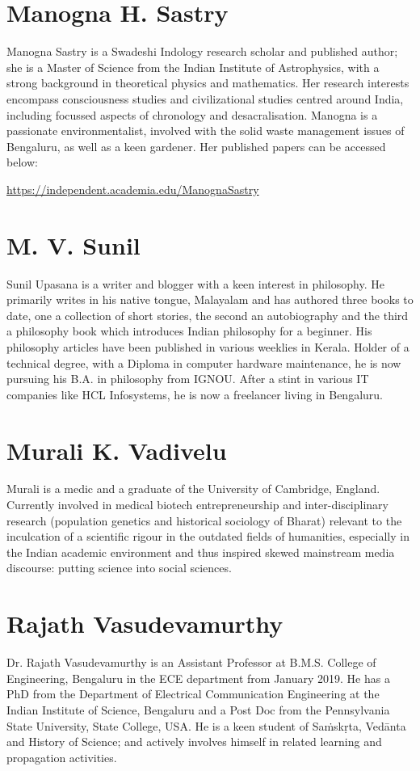 \section*{Manogna H. Sastry}

Manogna Sastry is a Swadeshi Indology research scholar and published author; she is a Master of Science from the Indian Institute of Astrophysics, with a strong background in theoretical physics and mathematics. Her research interests encompass consciousness studies and civilizational studies centred around India, including focussed aspects of chronology and desacralisation. Manogna is a passionate environmentalist, involved with the solid waste management issues of Bengaluru, as well as a keen gardener. Her published papers can be accessed below:

\url{https://independent.academia.edu/ManognaSastry}


\section*{M. V. Sunil}

Sunil Upasana is a writer and blogger with a keen interest in philosophy. He primarily writes in his native tongue, Malayalam and has authored three books to date, one a collection of short stories, the second an autobiography and the third a philosophy book which introduces Indian philosophy for a beginner. His philosophy articles have been published in various weeklies in Kerala. Holder of a technical degree, with a Diploma in computer hardware maintenance, he is now pursuing his B.A. in philosophy from IGNOU. After a stint in various IT companies like HCL Infosystems, he is now a freelancer living in Bengaluru.


\section*{Murali K. Vadivelu}

Murali is a medic and a graduate of the University of Cambridge, England. Currently involved in medical biotech entrepreneurship and inter-disciplinary research (population genetics and historical sociology of Bharat) relevant to the inculcation of a scientific rigour in the outdated fields of humanities, especially in the Indian academic environment and thus inspired skewed mainstream media discourse: putting science into social sciences.


\section*{Rajath Vasudevamurthy}

Dr. Rajath Vasudevamurthy is an Assistant Professor at B.M.S. College of Engineering, Bengaluru in the ECE department from January 2019. He has a PhD from the Department of Electrical Communication Engineering at the Indian Institute of Science, Bengaluru and a Post Doc from the Pennsylvania State University, State College, USA. He is a keen student of Saṁskṛta, Vedānta and History of Science; and actively involves himself in related learning and propagation activities.

